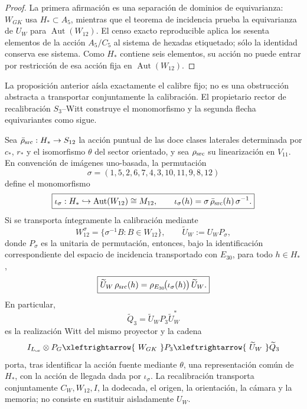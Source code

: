 \begin{proof}
La primera afirmación es una separación de dominios de equivarianza:
\(W_{GK}\) usa \(H_*\subset A_5\), mientras que el teorema de incidencia
prueba la equivarianza de \(U_W\) para
\(\operatorname{Aut}(W_{12})\). El censo exacto reproducible aplica los sesenta
elementos de la acción \(A_5/C_5\) al sistema de hexadas etiquetado; sólo la
identidad conserva ese sistema. Como \(H_*\) contiene seis elementos, su
acción no puede entrar por restricción de esa acción fija en
\(\operatorname{Aut}(W_{12})\).
\end{proof}

La proposición anterior aísla exactamente el calibre fijo; no es una
obstrucción abstracta a transportar conjuntamente la calibración. El
propietario rector de recalibración \(S_3\)--Witt construye el monomorfismo y
la segunda flecha equivariantes como sigue.

\begin{theorem}
\label{thm:recalibracion-hstar-witt}
Sea
\(\bar\rho_{\rm src}:H_*\to S_{12}\) la acción puntual de las doce clases
laterales determinada por \(c_*\), \(r_*\) y el isomorfismo \(\theta\) del
sector orientado, y sea \(\rho_{\rm src}\) su linearización en \(V_{11}\).
En convención de imágenes uno-basada, la permutación
\[
 \boxed{\sigma=(1,5,2,6,7,4,3,10,11,9,8,12)}
\]
define el monomorfismo
\[
 \boxed{
 \iota_\sigma:H_*\hookrightarrow\operatorname{Aut}(W_{12})\cong M_{12},
 \qquad
 \iota_\sigma(h)=
 \sigma\,\bar\rho_{\rm src}(h)\,\sigma^{-1}.
 }
\]
Si se transporta íntegramente la calibración mediante
\[
 W_{12}^{\sigma}=\{\sigma^{-1}B:B\in W_{12}\},
 \qquad
 \widetilde U_W:=U_WP_\sigma,
\]
donde \(P_\sigma\) es la unitaria de permutación, entonces, bajo la
identificación correspondiente del espacio de incidencia transportado con
\(E_{30}\), para todo \(h\in H_*\),
\[
 \boxed{
 \widetilde U_W\,\rho_{\rm src}(h)
 =\rho_{E_{30}}\!\bigl(\iota_\sigma(h)\bigr)\,\widetilde U_W.
 }
\]
En particular,
\[
 \widetilde Q_3=\widetilde U_WP_3\widetilde U_W^*
\]
es la realización Witt del mismo proyector y la cadena
\[
 I_{L_{\rm or}}\otimes P_G
 \xleftrightarrow{\ W_{GK}\ }
 P_3
 \xleftrightarrow{\ \widetilde U_W\ }
 \widetilde Q_3
\]
porta, tras identificar la acción fuente mediante \(\theta\), una
representación común de \(H_*\), con la acción de llegada dada por
\(\iota_\sigma\). La recalibración transporta conjuntamente
\(C_W,W_{12},I\), la dodecada, el origen, la orientación, la cámara y la
memoria; no consiste en sustituir aisladamente \(U_W\).
\end{theorem}

